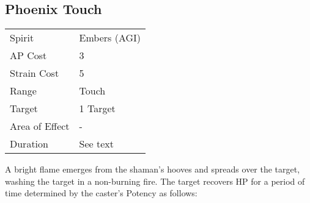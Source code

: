 \documentclass[11pt,a4paper,twocolumn]{book}
\begin{document}
%	



\subsection*{Phoenix Touch}
{
	\begin{tabu} to 75mm{| X[l,4] | X[l,7] |}
		\hline
		Spirit         & Embers (AGI) \\
		AP Cost        & 3            \\
		Strain Cost    & 5            \\
		Range          & Touch        \\
		Target         & 1 Target     \\
		Area of Effect & -            \\
		Duration       & See text     \\ \hline
	\end{tabu}
	
}

\medskip

A bright flame emerges from the shaman's hooves and spreads over the target, washing the target in a non-burning fire. The target recovers HP for a period of time determined by the caster's Potency as follows:
\end{document}
